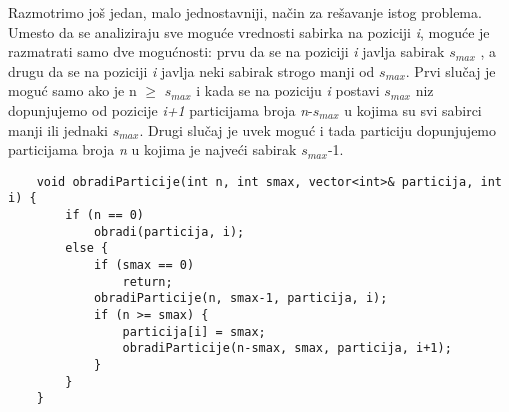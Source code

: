\documentclass{article}
\begin{document}
Razmotrimo još jedan, malo jednostavniji, način za rešavanje istog problema.
Umesto da se analiziraju sve moguće vrednosti sabirka na poziciji \textit{i}, moguće je
razmatrati samo dve mogućnosti: prvu da se na poziciji \textit{i} javlja sabirak $s_{max}$ , a drugu da se na poziciji \textit{i} javlja neki sabirak strogo manji od $s_{max}$. Prvi
slučaj je moguć samo ako je n $\geq$ $s_{max}$ i kada se na poziciju \textit{i} postavi $s_{max}$ niz
dopunjujemo od pozicije \textit{i+1} particijama broja \textit{n}-$s_{max}$ u kojima su svi sabirci
manji ili jednaki $s_{max}$. Drugi slučaj je uvek moguć i tada particiju dopunjujemo
particijama broja \textit{n} u kojima je najveći sabirak $s_{max}$-1.
\begin{lstlisting}
    void obradiParticije(int n, int smax, vector<int>& particija, int i) {
        if (n == 0)
            obradi(particija, i);
        else {
            if (smax == 0) 
                return;
            obradiParticije(n, smax-1, particija, i);
            if (n >= smax) {
                particija[i] = smax;
                obradiParticije(n-smax, smax, particija, i+1);
            }
        }
    }
\end{lstlisting}
\end{document}
